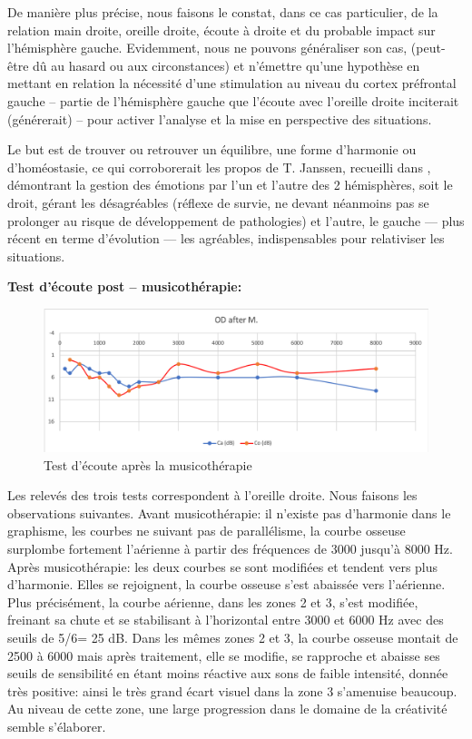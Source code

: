 De manière plus précise, nous faisons le constat, dans ce cas
particulier,  de la relation main droite, oreille droite, écoute
à droite et du probable impact sur l'hémisphère gauche.
Evidemment, nous ne pouvons généraliser son cas, (peut-être dû au hasard ou aux circonstances) et 
n'émettre qu'une hypothèse
en mettant en relation la nécessité d'une stimulation au niveau du cortex préfrontal
gauche -- partie de l'hémisphère gauche que l'écoute avec
l'oreille droite inciterait (générerait) -- pour activer l'analyse et la
mise en perspective des situations.

Le but est de trouver ou
retrouver un équilibre, une forme d'harmonie ou d'homéostasie, ce qui corroborerait les
propos de T. Janssen, recueilli dans  \autocite {van_eersel_cerveau}, démontrant la gestion des 
émotions par
l'un et l'autre des 2 hémisphères, soit le droit,  gérant les désagréables
(réflexe de survie, ne devant néanmoins pas se prolonger au risque de
développement de pathologies)
et l'autre, le gauche --- plus récent en terme d'évolution ---  les
agréables, indispensables pour relativiser les situations.

\textbf{ Test d'écoute post -- musicothérapie:}



\begin{figure}[h]
	\centering
	
	\includegraphics[width=1\linewidth]{images/clinique/od_after_m.png}
	\caption{Test d'écoute après la musicothérapie}
	\label{fig:odaftermeyer}
\end{figure}
Les relevés des trois tests correspondent à l'oreille droite.
Nous faisons les observations suivantes.
Avant musicothérapie: il n'existe pas d'harmonie dans le graphisme, les courbes ne suivant pas de 
parallélisme, la courbe osseuse  surplombe fortement l'aérienne 
à partir des fréquences de 3000 jusqu'à 8000 Hz.
Après musicothérapie:  les deux courbes se sont modifiées et tendent vers plus d'harmonie.
Elles se rejoignent, la courbe osseuse s'est abaissée vers l'aérienne.
 Plus précisément, la courbe aérienne, dans les
zones 2 et 3,  s'est modifiée, freinant sa
chute et se stabilisant à l'horizontal entre 3000 et 6000 Hz
avec des seuils de 5/6= 25 dB.
Dans les mêmes zones 2 et 3, la
courbe osseuse montait de 2500 à 6000 mais après traitement,
elle se modifie, se rapproche et abaisse ses seuils de
sensibilité en étant moins réactive aux sons de faible
intensité, donnée très positive: ainsi le très grand écart visuel dans la zone 3 s'amenuise beaucoup. Au 
niveau de cette
zone, une large progression dans
le domaine de la créativité semble s'élaborer. 

